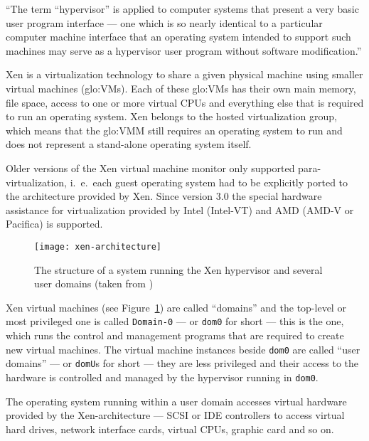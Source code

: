 ``The term “hypervisor” is applied to computer systems that present a very
basic user  program interface ---  one which is  so nearly identical  to a
particular computer machine interface that an operating system intended to
support  such machines  may serve  as  a hypervisor  user program  without
software modification.'' \cite{hendricks79}

\bigskip

Xen \cite{xen}  is a virtualization  technology to share a  given physical
machine  using smaller  virtual machines  (\gls{glo:VM}s).  Each  of these
\gls{glo:VM}s has their own main memory, file space, access to one or more
virtual  CPUs and everything  else that  is required  to run  an operating
system.  Xen belongs to the  hosted virtualization group, which means that
the \gls{glo:VMM} still  requires an operating system to  run and does not
represent a stand-alone operating system itself.

Older  versions  of  the   Xen  virtual  machine  monitor  only  supported
para-virtualization,   i.~e.~each  guest  operating   system  had   to  be
explicitly ported to the architecture  provided by Xen.  Since version 3.0
the  special  hardware assistance  for  virtualization  provided by  Intel
(Intel-VT) and AMD (AMD-V or Pacifica) is supported.

\begin{figure}[htbp]
  \begin{center}
    \texttt{[image: xen-architecture]}
  \end{center}
  \caption[Xen architecture]{The structure of a system running the Xen
    hypervisor and several user domains (taken from \cite{xen-art})}
  \label{fig:xen-architecture}
\end{figure}

Xen  virtual machines  (see Figure~\ref{fig:xen-architecture})  are called
``domains''  and   the  top-level  or   most  privileged  one   is  called
\texttt{Domain-0}  --- or  \texttt{dom0} for  short ---  this is  the one,
which runs the control and management programs that are required to create
new virtual machines.  The  virtual machine instances beside \texttt{dom0}
are called ``user  domains'' --- or \texttt{domU}s for  short --- they are
less privileged and their access to the hardware is controlled and managed
by the hypervisor running in \texttt{dom0}.

The  operating  system  running  within  a user  domain  accesses  virtual
hardware provided by  the Xen-architecture --- SCSI or  IDE controllers to
access virtual hard drives, network interface cards, virtual CPUs, graphic
card and so on.


